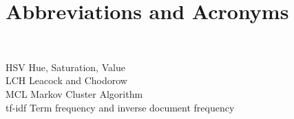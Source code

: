 \newpage

\section{Abbreviations and Acronyms}

\begin{tabbing}
\hspace*{3cm}\=  \\ \kill

HSV \> Hue, Saturation, Value\\
LCH \> Leacock and Chodorow\\
MCL \> Markov Cluster Algorithm\\
tf-idf \> Term frequency and inverse document frequency\\

\end{tabbing}
